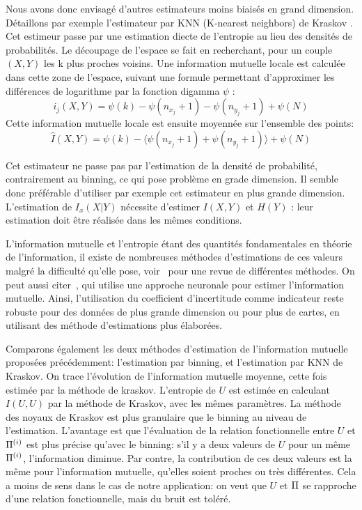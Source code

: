 Nous avons donc envisagé d'autres estimateurs moins biaisés en grand dimension. Détaillons par exemple l'estimateur par KNN (K-nearest neighbors) de Kraskov \cite{2004kraskov}. Cet estimeur passe par une estimation diecte de l'entropie au lieu des densités de probabilités. Le découpage de l'espace se fait en recherchant, pour un couple $(X,Y)$ les k plus proches voisins. Une information mutuelle locale est calculée dans cette zone de l'espace, suivant une formule permettant d'approximer les différences de logarithme par la fonction digamma $\psi$ : 
$$i_j(X,Y) = \psi(k) - \psi(n_{x_j} + 1) - \psi(n_{y_j} +1) + \psi(N)$$
Cette information mutuelle locale est ensuite moyennée sur l'ensemble des points: 
$$\hat{I}(X,Y) = \psi(k) - \langle\psi(n_{x_j} + 1) + \psi(n_{y_j} +1)\rangle + \psi(N)$$

Cet estimateur ne passe pas par l'estimation de la densité de probabilité, contrairement au binning, ce qui pose problème en grade dimension. Il semble donc préférable d'utiliser par exemple cet estimateur en plus grande dimension.
L'estimation de $I_x(X|Y)$ nécessite d'estimer $I(X,Y)$ et $H(Y)$ : leur estimation doit être réalisée dans les mêmes conditions.

L'information mutuelle et l'entropie étant des quantités fondamentales en théorie de l'information, il existe de nombreuses méthodes d'estimations de ces valeurs malgré la difficulté qu'elle pose, voir~\cite{Doquire2012ACO} pour une revue de différentes méthodes. On peut aussi citer~\cite{Belghazi2018MutualIN}, qui utilise une approche neuronale pour estimer l'information mutuelle. Ainsi, l'utilisation du coefficient d'incertitude comme indicateur reste robuste pour des données de plus grande dimension ou pour plus de cartes, en utilisant des méthode d'estimations plus élaborées. 

Comparons également les deux méthodes d'estimation de l'information mutuelle proposées précédemment: l'estimation par binning, et l'estimation par KNN de Kraskov.
On trace l'évolution de l'information mutuelle moyenne, cette fois estimée par la méthode de kraskov. L'entropie de $U$ est estimée en calculant $I(U,U)$ par la méthode de Kraskov, avec les mêmes paramètres. 
La méthode des noyaux de Kraskov est plus granulaire que le binning au niveau de l'estimation. L'avantage est que l'évaluation de la relation fonctionnelle entre $U$ et $\Pi^{({i})}$ est plus précise qu'avec le binning: s'il y a deux valeurs de $U$ pour un même $\Pi^{({i})}$, l'information diminue. Par contre, la contribution de ces deux valeurs est la même pour l'information mutuelle, qu'elles soient proches ou très différentes. Cela a moins de sens dans le cas de notre application: on veut que $U$ et $\Pi$ se rapproche d'une relation fonctionnelle, mais du bruit est toléré. 

